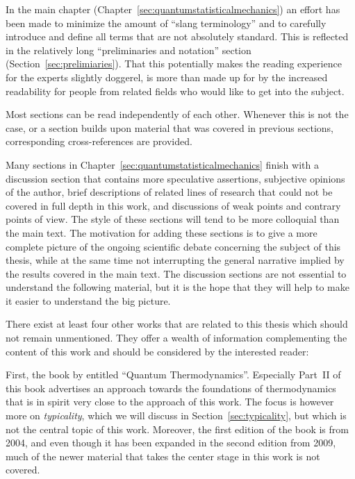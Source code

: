 \documentclass[a4paper,12pt,listof=totoc,index=totoc,bibliography=totoc,headsepline=false,headings=normal,BCOR16.153846mm,DIV12,headinclude,twoside,cleardoublepage=empty,numbers=noenddot,final]{scrreprt}
\theoremstyle{mystyle}
\numberwithin{equation}{section}
\numberwithin{figure}{section}
\numberwithin{lemma}{section}
\numberwithin{theorem}{section}
\numberwithin{corollary}{section}
\numberwithin{definition}{section}
\numberwithin{conjecture}{section}
\numberwithin{observation}{section}
\newcommand{\+}{\mkern2mu}
\DeclareMathOperator{\1}{\mathds{1}}
\begin{document}
In the main chapter (Chapter~\ref{sec:quantumstatisticalmechanics}) an effort has been made to minimize the amount of ``slang terminology'' and to carefully introduce and define all terms that are not absolutely standard.
This is reflected in the relatively long ``preliminaries and notation'' section (Section~\ref{sec:prelimiaries}).
That this potentially makes the reading experience for the experts slightly doggerel, is more than made up for by the increased readability for people from related fields who would like to get into the subject.

Most sections can be read independently of each other.
Whenever this is not the case, or a section builds upon material that was covered in previous sections, corresponding cross-references are provided.

Many sections in Chapter~\ref{sec:quantumstatisticalmechanics} finish with a discussion section that contains more speculative assertions, subjective opinions of the author, brief descriptions of related lines of research that could not be covered in full depth in this work, and discussions of weak points and contrary points of view.
The style of these sections will tend to be more colloquial than the main text.
The motivation for adding these sections is to give a more complete picture of the ongoing scientific debate concerning the subject of this thesis, while at the same time not interrupting the general narrative implied by the results covered in the main text.
The discussion sections are not essential to understand the following material, but it is the hope that they will help to make it easier to understand the big picture.

There exist at least four other works that are related to this thesis which should not remain unmentioned.
They offer a wealth of information complementing the content of this work and should be considered by the interested reader:

First, the book by \textcite{Gemmer09} entitled ``Quantum Thermodynamics''.
Especially Part~II of this book advertises an approach towards the foundations of thermodynamics that is in spirit very close to the approach of this work.
The focus is however more on \emph{typicality}, which we will discuss in Section~\ref{sec:typicality}, but which is not the central topic of this work.
Moreover, the first edition of the book is from 2004, and even though it has been expanded in the second edition from 2009, much of the newer material that takes the center stage in this work is not covered.
\end{document}
